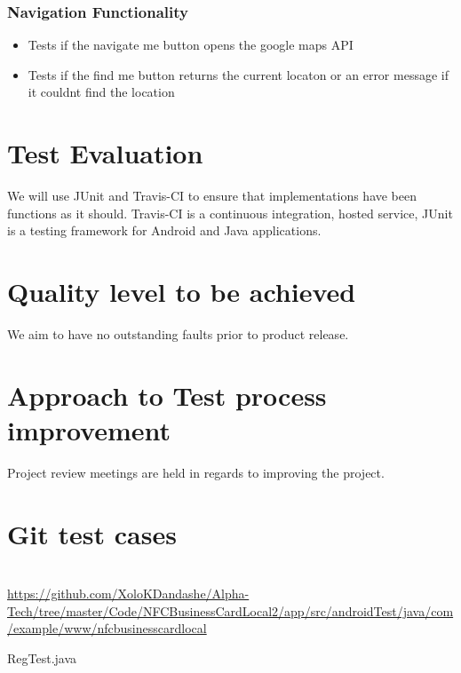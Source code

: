 \documentclass[english]{article}
\begin{document}
		\subsubsection{Navigation Functionality}
		\begin{itemize}
			\item Tests if the navigate me button opens the google maps API
			\item Tests if the find me button returns the current locaton or an error message if it couldnt find the location
\\
					\href{url}{}
		\end{itemize}
		
			
	
		

	\section{Test Evaluation}
	
	We will use JUnit and  Travis-CI to ensure that implementations have been functions as it should.
	Travis-CI is a continuous integration, hosted service,  JUnit is a testing framework for Android and Java applications.
	\section{Quality level to be achieved}
	We aim to have no outstanding faults prior to product release.
	
	\section{Approach to Test process improvement}
	
	Project review meetings are held in regards to improving the project.
	
	
	 
	\section{Git test cases  }
\\
					\href{url}{https://github.com/XoloKDandashe/Alpha-Tech/tree/master/Code/NFCBusinessCardLocal2/app/src/androidTest/java/com/example/www/nfcbusinesscardlocal}

	
	RegTest.java
		
\end{document}
